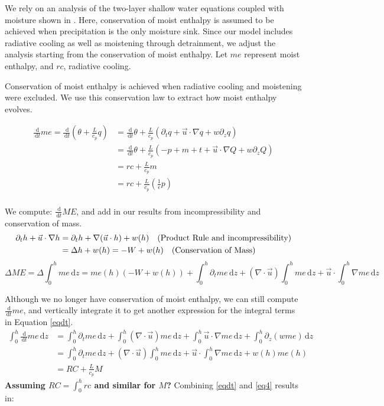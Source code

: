 \documentclass[10pt]{article}
\newcommand{\rmd}{\,\mathrm{d}}
\begin{document}
We rely on an analysis of the two-layer shallow water equations coupled with moisture shown in \citet{LLZB2011}.
Here, conservation of moist enthalpy is assumed to be achieved when precipitation is the only moisture sink. 
Since our model includes radiative cooling as well as moistening through detrainment, we adjust the analysis starting from the conservation of moist enthalpy. 
Let $me$ represent moist enthalpy, and $rc$, radiative cooling.

Conservation of moist enthalpy is achieved when radiative cooling and moistening were excluded. 
We use this conservation law to extract how moist enthalpy evolves.

\begin{align*}
\frac{\rmd}{\rmd t} me = \frac{\rmd}{\rmd t}\left(\theta + \frac{L}{c_p}q\right) &= \frac{\rmd}{\rmd t}\theta + \frac{L}{c_p}\left(\partial_t q + \vec{u}\cdot \nabla q + w\partial_z q\right) \\
&= \frac{\rmd}{\rmd t}\theta + \frac{L}{c_p}\left(-p + m + t+ \vec{u}\cdot \nabla Q + w\partial_z Q\right) \\
&= rc +\frac{L}{c_p} m \\
&= rc +\frac{L}{c_p} \left(\frac{1}{\epsilon} p\right) \\
\end{align*}

We compute: $\frac{\rmd}{\rmd t} ME $, and add in our results from incompressibility and conservation of mass.
\begin{align*}
\partial_t h +\vec{u}\cdot \nabla h &= \partial_t h +\nabla(\vec{u}\cdot h) + w(h) \text{\quad (Product Rule and incompressibility)}\\
&= \Delta h + w(h) = -W + w(h)\text{\quad (Conservation of Mass) }
\end{align*}
\begin{equation}
\Delta ME = \Delta \int_{0}^{h} me \rmd z= me(h)\left( -W + w(h) \right) + \int_{0}^{h} \partial_tme \rmd z + \left(\nabla \cdot\vec{u} \right)\int_{0}^{h} me \rmd z + \vec{u}\cdot \int_{0}^{h}\nabla me \rmd z 
 \label{eqdt}
\end{equation}
  
Although we no longer have conservation of moist enthalpy, we can still compute $\frac{\rmd}{\rmd t} me$, and vertically integrate it to get another expression for the integral terms in Equation \ref{eqdt}.  
\begin{align}
\int_{0}^{h} \frac{\rmd}{\rmd t} me \rmd z &= \int_{0}^{h} \partial_t me \rmd z + \int_{0}^{h} (\nabla \cdot \vec{u}) me \rmd z + \int_{0}^{h} \vec{u} \cdot \nabla me \rmd z + \int_{0}^{h} \partial_z (w me) \rmd z \\
&= \int_{0}^{h} \partial_t me \rmd z + (\nabla \cdot \vec{u})\int_{0}^{h}  me \rmd z + \vec{u} \cdot \int_{0}^{h} \nabla me \rmd z + w(h)me(h) \\
&= RC + \frac{L}{c_p} M \label{eq4}
\end{align}
{\bf Assuming $RC = \int_0^h rc$ and similar for $M$?}
Combining \ref{eqdt} and \ref{eq4} results in:
\end{document}
